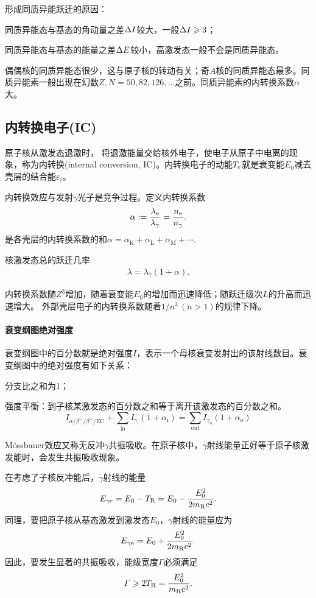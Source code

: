 形成同质异能跃迁的原因：
\begin{compactenum}
	\item 同质异能态与基态的角动量之差$\Delta I$较大，一般$\Delta I\geqslant 3$；
	\item 同质异能态与基态的能量之差$\Delta E$较小，高激发态一般不会是同质异能态。
\end{compactenum}
偶偶核的同质异能态很少，这与原子核的转动有关；奇$A$核的同质异能态最多。同质异能素一般出现在幻数$Z,N=50,82,126,\ldots$之前。同质异能素的内转换系数$\alpha$大。

\subsection{内转换电子(IC)}

原子核从激发态退激时，%
将退激能量交给核外电子，使电子从原子中电离的现象，称为内转换(internal conversion, IC)。内转换电子的动能$T_\mathrm e$就是衰变能$E_0$减去壳层的结合能$\varepsilon_i$。

内转换效应与发射$\gamma$光子是竞争过程。定义内转换系数
\begin{align}
	\alpha:=\frac{\lambda_\mathrm e}{\lambda_\gamma}=\frac{n_\mathrm e}{n_\gamma}.
\end{align}
是各壳层的内转换系数的和$\alpha=\alpha_\mathrm K+\alpha_\mathrm L+\alpha_\mathrm M+\cdots.$

核激发态总的跃迁几率
\begin{align}
	\lambda=\lambda_\gamma(1+\alpha).
\end{align}

内转换系数随$Z^3$增加，随着衰变能$E_0$的增加而迅速降低；随跃迁级次$L$的升高而迅速增大。
外部壳层电子的内转换系数随着$1/n^3\,(n>1)$的规律下降。
\paragraph{衰变纲图绝对强度}衰变纲图中的百分数就是绝对强度$I$，表示一个母核衰变发射出的该射线数目。衰变纲图中的绝对强度有如下关系：
\begin{compactenum}
	\item 分支比之和为1；
	\item 强度平衡：到子核某激发态的百分数之和等于离开该激发态的百分数之和。
	\[
		I_{\alpha/\beta^-/\beta^+/\mathrm{EC}}+\sum_{\mathrm{in}} I_{\gamma_\mathrm i}(1+\alpha_\mathrm i)=\sum_{\mathrm{out}} I_{\gamma_\mathrm o}(1+\alpha_\mathrm o)
	\]
\end{compactenum}

\label{Mossbauer}

Mössbauer效应又称无反冲$\gamma$共振吸收。在原子核中，$\gamma$射线能量正好等于原子核激发能时，会发生共振吸收现象。

在考虑了子核反冲能后，$\gamma$射线的能量
\[
	E_{\gamma\mathrm e}=E_0-T_{\mathrm{R}}=E_0-\frac{E_0^2}{2m_{\mathrm{R}}c^2}.
\]
同理，要把原子核从基态激发到激发态$E_0$，$\gamma$射线的能量应为
\[
	E_{\gamma\mathrm a}=E_0+\frac{E_0^2}{2m_{\mathrm{R}}c^2}.
\]
因此，要发生显著的共振吸收，能级宽度$\varGamma$必须满足
\begin{align}
	\varGamma\geqslant 2T_{\mathrm{R}}=\frac{E_0^2}{m_{\mathrm{R}}c^2}.
\end{align}

